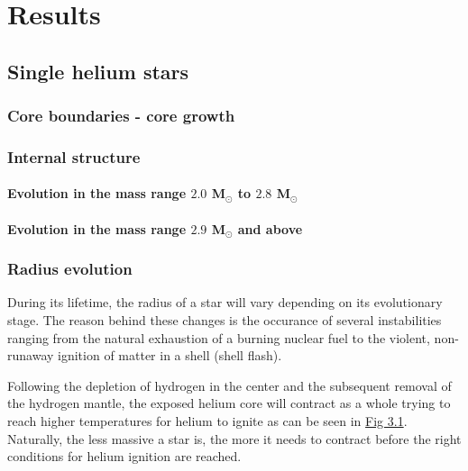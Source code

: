\documentclass[../../main/thesis_msc.tex]{subfiles}
\begin{document}
	\chapter{Results}
	
		
		
			\section{Single helium stars}
			
				\subsection{Core boundaries - core growth}
			
				\subsection{Internal structure}
				
					\subsubsection{Evolution in the mass range $2.0$ M$_{\odot}$ to $2.8$ M$_{\odot}$}
					
					\subsubsection{Evolution in the mass range $2.9$ M$_{\odot}$ and above}
				
				
				\subsection{Radius evolution}
					During its lifetime, the radius of a star will vary depending on its evolutionary stage. The reason behind these changes is the occurance of several instabilities ranging from the natural exhaustion of a burning nuclear fuel to the violent, non-runaway ignition of matter in a shell (shell flash). 
					
					Following the depletion of hydrogen in the center and the subsequent removal of the hydrogen mantle, the exposed helium core will contract as a whole trying to reach higher temperatures for helium to ignite as can be seen in \hyperref[fig:radii_singles]{Fig 3.1}. Naturally, the less massive a star is, the more it needs to contract before the right conditions for helium ignition are reached.
				
\end{document}
